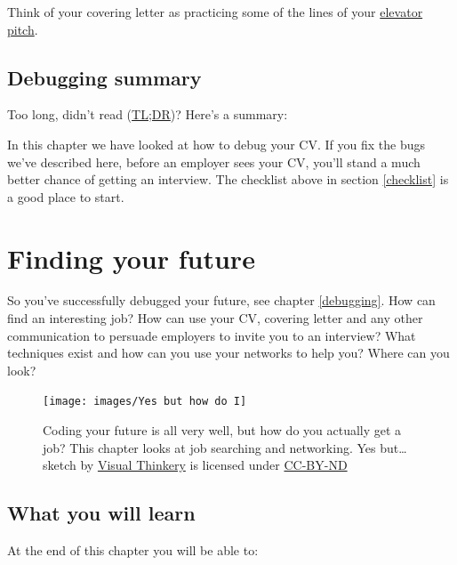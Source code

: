 \documentclass[
]{book}
\begin{document}
Think of your covering letter as practicing some of the lines of your \href{https://en.wikipedia.org/wiki/Elevator_pitch}{elevator pitch}.

\hypertarget{tldr7}{%
\section{Debugging summary}\label{tldr7}}

Too long, didn't read (\href{https://en.wiktionary.org/wiki/too_long;_didn\%27t_read}{TL;DR})? Here's a summary:

In this chapter we have looked at how to debug your CV. If you fix the bugs we've described here, before an employer sees your CV, you'll stand a much better chance of getting an interview. The checklist above in section \ref{checklist} is a good place to start.

\hypertarget{finding}{%
\chapter{Finding your future}\label{finding}}

So you've successfully debugged your future, see chapter \ref{debugging}. How can find an interesting job? How can use your CV, covering letter and any other communication to persuade employers to invite you to an interview? What techniques exist and how can you use your networks to help you? Where can you look? 🔭

\begin{figure}

{\centering \texttt{[image: images/Yes but how do I]} 

}

\caption{Coding your future is all very well, but how do you actually get a job? This chapter looks at job searching and networking. Yes but\ldots{} sketch by \href{https://visualthinkery.com}{Visual Thinkery} is licensed under \href{https://creativecommons.org/licenses/by-nd/4.0/}{CC-BY-ND}}\label{fig:yesbut-fig}
\end{figure}



\hypertarget{ilo8}{%
\section{What you will learn}\label{ilo8}}

At the end of this chapter you will be able to:
\end{document}
